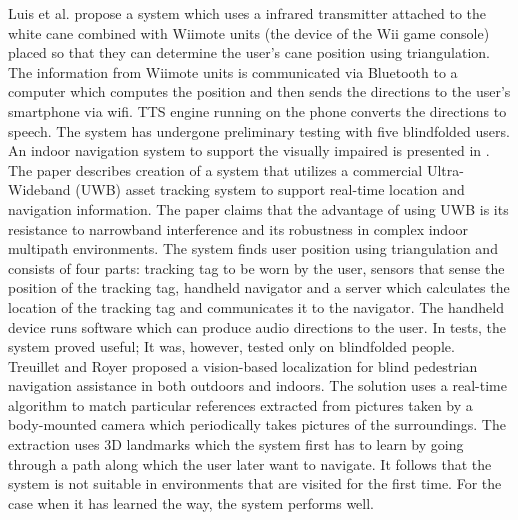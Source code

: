 Luis et al.\cite{luis} propose a system which uses a infrared transmitter attached to the white cane combined with Wiimote units (the device of the Wii game console) placed so that they can determine the user's cane position using triangulation. The information from Wiimote units is communicated via Bluetooth to a computer which computes the position and then sends the directions to the user's smartphone via wifi. TTS engine running on the phone converts the directions to speech. The system has undergone preliminary testing with five blindfolded users. \\

An indoor navigation system to support the visually impaired is presented in \cite{riehle}. The paper describes creation of a system that utilizes a commercial Ultra-Wideband (UWB) asset tracking system to support real-time location and navigation information. The paper claims that the advantage of using UWB is its resistance to narrowband interference and its  robustness in complex indoor multipath environments. The system finds user position using triangulation and consists of four parts: tracking tag to be worn by the user, sensors that sense the position of the tracking tag, handheld navigator and a server which calculates the location of the tracking tag and communicates it to the navigator. The handheld device runs software which can produce audio directions to the user. In tests, the system proved useful; It was, however, tested only on blindfolded people.\\

Treuillet and Royer \cite{sylvie} proposed a vision-based localization for blind pedestrian navigation assistance in both outdoors and indoors. The solution uses a real-time algorithm to match particular references extracted from pictures taken by a body-mounted camera which periodically takes pictures of the surroundings. The extraction uses 3D landmarks which the system first has to learn by going through a path along which the user later want to navigate. It follows that the system is not suitable in environments that are visited for the first time. For the case when it has learned the way, the system performs well.

